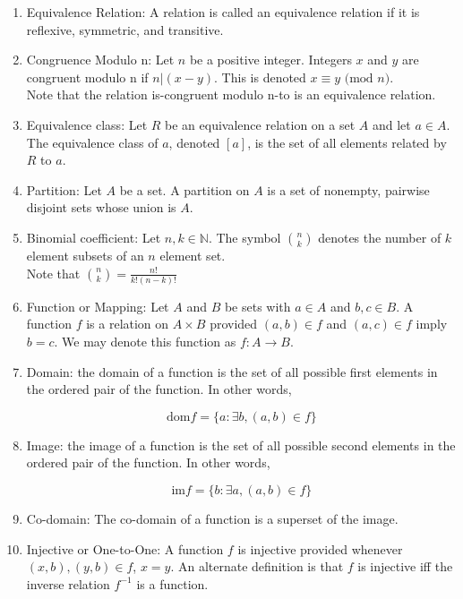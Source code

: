 \documentclass{article}
\begin{document}
\begin{enumerate}
		\item Equivalence Relation: A relation is called an equivalence relation if it is reflexive, symmetric, and transitive.
		
		\item Congruence Modulo n: Let $n$ be a positive integer.
		Integers $x$ and $y$ are congruent modulo n if $n|(x-y)$.
		This is denoted $x \equiv y$ $(\text{mod}$ $n)$.\\
		
		Note that the relation is-congruent modulo n-to is an equivalence relation.
		
		\item Equivalence class: Let $R$ be an equivalence relation on a set $A$ and let $a\in A$.
		The equivalence class of $a$, denoted $[a]$, is the set of all elements related by $R$ to $a$.
		
		\item Partition: Let $A$ be a set.
		A partition on $A$ is a set of nonempty, pairwise disjoint sets whose union is $A$.
		
		\item Binomial coefficient: Let $n,k\in\mathbb{N}$.
		The symbol ${n\choose k}$ denotes the number of $k$ element subsets of an $n$ element set.\\
		
		Note that ${n\choose k}=\frac{n!}{k!(n-k)!}$
		
		\item Function or Mapping: Let $A$ and $B$ be sets with $a\in A$ and $b,c\in B$.
		A function $f$ is a relation on $A\times B$ provided $(a,b)\in f$ and $(a,c)\in f$ imply $b=c$.
		We may denote this function as $f: A\to B$.
		
		\item Domain: the domain of a function is the set of all possible first elements in the ordered pair of the function.
		In other words,
		
		\[\text{dom} f= \{a: \exists b, (a,b)\in f\}\]
		
		\item Image: the image of a function is the set of all possible second elements in the ordered pair of the function.
		In other words,
		
		\[\text{im} f= \{b: \exists a, (a,b)\in f\}\]
		
		\item Co-domain: The co-domain of a function is a superset of the image.
		
		\item Injective or One-to-One: A function $f$ is injective provided whenever $(x,b),(y,b)\in f$, $x=y$.
		An alternate definition is that $f$ is injective iff the inverse relation $f^{-1}$ is a function.
		

\end{enumerate}
\end{document}
